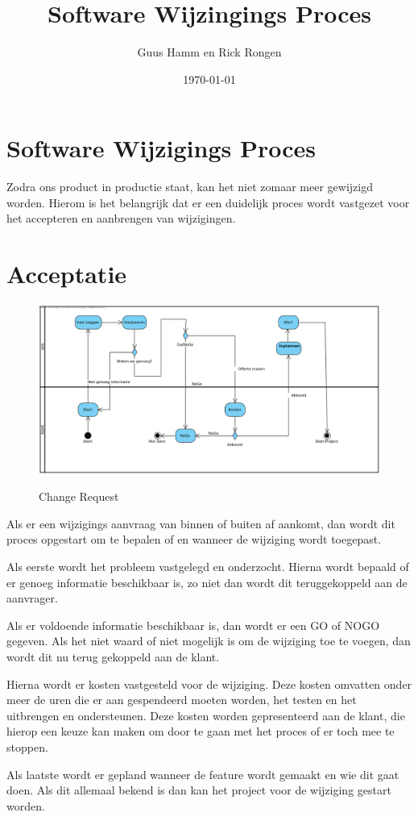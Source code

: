 \documentclass{scrreprt}
\title{Software Wijzingings Proces}
\author{Guus Hamm en Rick Rongen}
\date{\today}
\begin{document}
	\maketitle
	\tableofcontents
	\newpage
	\chapter{Software Wijzigings Proces}
		Zodra ons product in productie staat, kan het niet zomaar meer gewijzigd worden. Hierom is het belangrijk dat er een duidelijk proces wordt vastgezet voor het accepteren en aanbrengen van wijzigingen.
	
	\chapter{Acceptatie}
	\begin{figure}[ht]
		\centering
		\includegraphics[width=\linewidth]{change-request}
		\label{fig:change-request}
		\caption{Change Request}
	\end{figure}
		Als er een wijzigings aanvraag van binnen of buiten af aankomt, dan wordt dit proces opgestart om te bepalen of en wanneer de wijziging wordt toegepast.\par
		
		Als eerste wordt het probleem vastgelegd en onderzocht. Hierna wordt bepaald of er genoeg informatie beschikbaar is, zo niet dan wordt dit teruggekoppeld aan de aanvrager.\par
		Als er voldoende informatie beschikbaar is, dan wordt er een GO of NOGO gegeven. Als het niet waard of niet mogelijk is om de wijziging toe te voegen, dan wordt dit nu terug gekoppeld aan de klant.\par
		Hierna wordt er kosten vastgesteld voor de wijziging. Deze kosten omvatten onder meer de uren die er aan gespendeerd moeten worden, het testen en het uitbrengen en ondersteunen. Deze kosten worden gepresenteerd aan de klant, die hierop een keuze kan maken om door te gaan met het proces of er toch mee te stoppen.\par
		Als laatste wordt er gepland wanneer de feature wordt gemaakt en wie dit gaat doen. Als dit allemaal bekend is dan kan het project voor de wijziging gestart worden.
\end{document}
